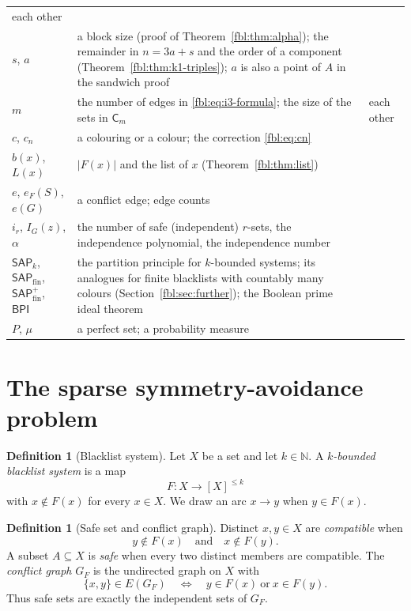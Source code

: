 \documentclass[11pt]{article}
\theoremstyle{definition}
\newtheorem{definition}[theorem]{Definition}
\theoremstyle{remark}
\newcommand{\N}{\mathbb N}
\newcommand{\BPI}{\mathsf{BPI}}
\newcommand{\SAP}{\mathsf{SAP}}
\newcommand{\Cm}{\mathsf{C}}
\begin{document}
\begin{center}
\begin{tabularx}{\textwidth}{@{}>{\raggedright\arraybackslash}p{}>{\raggedright\arraybackslash}X>{\raggedright\arraybackslash}p{}@{}}
 each other\\
$s$, $a$ & a block size (proof of Theorem~\ref{fbl:thm:alpha}); the
 remainder in $n=3a+s$ and the order of a component
 (Theorem~\ref{fbl:thm:k1-triples}); $a$ is also a point of $A$ in the
 sandwich proof & \\
$m$ & the number of edges in \eqref{fbl:eq:i3-formula}; the size of the
 sets in $\Cm_m$ & each other\\
$c$, $c_n$ & a colouring or a colour; the correction \eqref{fbl:eq:cn} & \\
$b(x)$, $L(x)$ & $\lvert F(x)\rvert$ and the list of $x$
 (Theorem~\ref{fbl:thm:list}) & \\
$e$, $e_F(S)$, $e(G)$ & a conflict edge; edge counts & \\
$i_r$, $I_G(z)$, $\alpha$ & the number of safe (independent) $r$-sets, the
 independence polynomial, the independence number & \\
$\SAP_k$, $\SAP_{\mathrm{fin}}$, $\SAP^{+}_{\mathrm{fin}}$, $\BPI$ & the
 partition principle for $k$-bounded systems; its analogues for finite
 blacklists with countably many colours (Section~\ref{fbl:sec:further}); the
 Boolean prime ideal theorem &
 \\
$P$, $\mu$ & a perfect set; a probability measure & \\
\bottomrule
\end{tabularx}
\end{center}

\section{The sparse symmetry-avoidance problem}

\begin{definition}[Blacklist system]
Let $X$ be a set and let $k\in\N$.  A \emph{$k$-bounded blacklist system} is
a map
\[
   F:X\longrightarrow [X]^{\le k}
\]
with $x\notin F(x)$ for every $x\in X$.  We draw an arc $x\to y$ when
$y\in F(x)$.
\end{definition}

\begin{definition}[Safe set and conflict graph]
Distinct $x,y\in X$ are \emph{compatible} when
\[
       y\notin F(x)\quad\text{and}\quad x\notin F(y).
\]
A subset $A\subseteq X$ is \emph{safe} when every two distinct members are
compatible.  The \emph{conflict graph} $G_F$ is the undirected graph on $X$
with
\[
   \{x,y\}\in E(G_F)
   \quad\Longleftrightarrow\quad
   y\in F(x)\ \text{or}\ x\in F(y).
\]
Thus safe sets are exactly the independent sets of $G_F$.
\end{definition}
\end{document}
